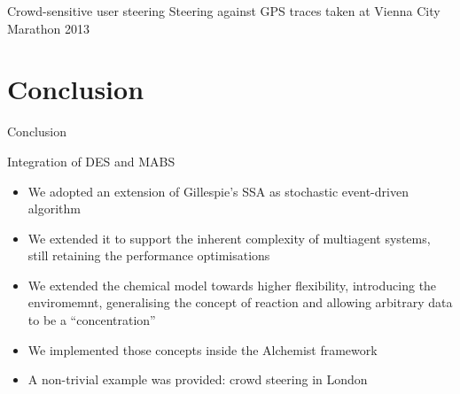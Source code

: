 \documentclass[presentation]{beamer} %
\begin{document}
\begin{frame}{Crowd-sensitive user steering}
{\footnotesize Steering against GPS traces taken at Vienna City Marathon 2013}
\begin{center}
\end{center}
\end{frame}

\section{Conclusion}
\begin{frame}{Conclusion}
  \begin{block}{Integration of DES and MABS}
    \begin{itemize}
      \item We adopted an extension of Gillespie's SSA as stochastic event-driven algorithm
      \item We extended it to support the inherent complexity of multiagent systems, still retaining the performance optimisations
      \item We extended the chemical model towards higher flexibility, introducing the enviromemnt, generalising the concept of reaction and allowing arbitrary data to be a ``concentration''
      \item We implemented those concepts inside the Alchemist framework
      \item A non-trivial example was provided: crowd steering in London
    \end{itemize}
  \end{block}
\end{frame}



\section*{\refname}
\begin{frame}[allowframebreaks]
  \frametitle{\refname}
  \scriptsize
  
  
\end{frame}
\section*{\refname}
\end{document}
